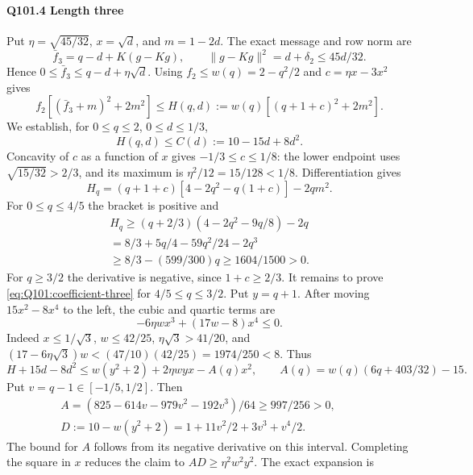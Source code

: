 \paragraph{Q101.4 Length three}\label{part:Q101.4}
Put $\eta=\allowbreak \sqrt{45/32}$, $x=\allowbreak \sqrt d$, and $m=\allowbreak 1-2d$.
The exact message and row norm are
\[
 \bar f_3=q-d+K(g-Kg),\qquad
 \|g-Kg\|^2=d+\delta_2\le45d/32.
\]
Hence $0\le\allowbreak \bar f_3\le\allowbreak  q-d+\eta\sqrt d$.
Using $f_2\le\allowbreak  w(q)=\allowbreak 2-q^2/2$ and $c=\allowbreak \eta x-3x^2$ gives
\[
 f_2[(\bar f_3+m)^2+2m^2]
 \le H(q,d):=w(q)[(q+1+c)^2+2m^2].
\]
We establish, for $0\le\allowbreak  q\le\allowbreak 2$, $0\le\allowbreak  d\le\allowbreak 1/3$,
\begin{equation}\tag{Q101.4.1}\label{eq:Q101:coefficient-three}
 H(q,d)\le C(d):=10-15d+8d^2.
\end{equation}
Concavity of $c$ as a function of $x$ gives $-1/3\le\allowbreak  c\le\allowbreak 1/8$:
the lower endpoint uses $\sqrt{15/32}>\allowbreak 2/3$, and its maximum is
$\eta^2/12=\allowbreak 15/128<\allowbreak 1/8$. Differentiation gives
\[
 H_q=(q+1+c)[4-2q^2-q(1+c)]-2qm^2.
\]
For $0\le\allowbreak  q\le\allowbreak 4/5$ the bracket is positive and
\[
\begin{gathered}
H_q\ge(q+2/3)(4-2q^2-9q/8)-2q\\
=8/3+5q/4-59q^2/24-2q^3\\
\ge8/3-(599/300)q\ge1604/1500>0.
\end{gathered}
\]
For $q\ge\allowbreak 3/2$ the derivative is negative, since $1+c\ge\allowbreak 2/3$.
It remains to prove \eqref{eq:Q101:coefficient-three} for
$4/5\le\allowbreak  q\le\allowbreak 3/2$. Put $y=\allowbreak q+1$.
After moving $15x^2-8x^4$ to the left, the cubic and quartic terms are
\[
 -6\eta wx^3+(17w-8)x^4\le0.
\]
Indeed $x\le\allowbreak 1/\sqrt3$, $w\le\allowbreak 42/25$, $\eta\sqrt3>\allowbreak 41/20$, and
$(17-6\eta\sqrt3)w<\allowbreak (47/10)(42/25)=\allowbreak 1974/250<\allowbreak 8$.
Thus
\[
 H+15d-8d^2\le w(y^2+2)+2\eta wyx-A(q)x^2,\qquad
 A(q)=w(q)(6q+403/32)-15.
\]
Put $v=\allowbreak q-1\in[-1/5,\allowbreak 1/2]$. Then
\[
\begin{gathered}
A=(825-614v-979v^2-192v^3)/64\ge997/256>0,\qquad\\
D:=10-w(y^2+2)=1+11v^2/2+3v^3+v^4/2.
\end{gathered}
\]
The bound for $A$ follows from its negative derivative on this interval.
Completing the square in $x$ reduces the claim to
$AD\ge\allowbreak \eta^2w^2y^2$. The exact expansion is
